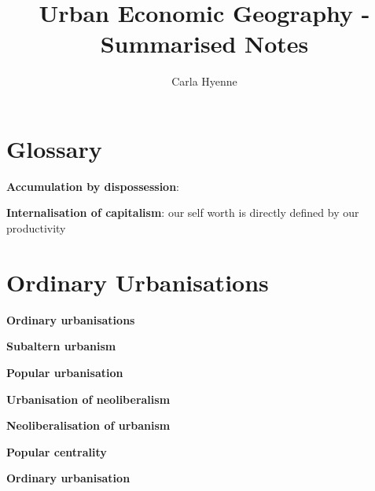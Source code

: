\documentclass{article}
\title{Urban Economic Geography - Summarised Notes}
\author{Carla Hyenne }
\begin{document}
\maketitle

\tableofcontents

\pagebreak

\section{Glossary}

\textbf{Accumulation by dispossession}:

\textbf{Internalisation of capitalism}: our self worth is directly defined by our productivity

\section{Ordinary Urbanisations}

\textbf{Ordinary urbanisations}

\textbf{Subaltern urbanism}

\textbf{Popular urbanisation}

\textbf{Urbanisation of neoliberalism}

\textbf{Neoliberalisation of urbanism}

\textbf{Popular centrality}

\textbf{Ordinary urbanisation}


\textbf{}


\textbf{}
\end{document}
